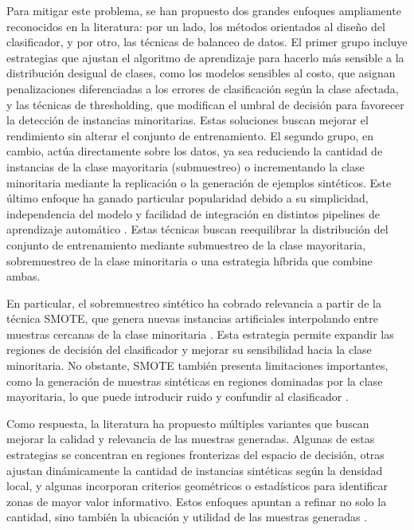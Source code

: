 \documentclass[12pt,a4paper]{article}
\begin{document}
Para mitigar este problema, se han propuesto dos grandes enfoques ampliamente reconocidos en la literatura: por un lado, los métodos orientados al diseño del clasificador, y por otro, las técnicas de balanceo de datos. El primer grupo incluye estrategias que ajustan el algoritmo de aprendizaje para hacerlo más sensible a la distribución desigual de clases, como los modelos sensibles al costo, que asignan penalizaciones diferenciadas a los errores de clasificación según la clase afectada, y las técnicas de thresholding, que modifican el umbral de decisión para favorecer la detección de instancias minoritarias. Estas soluciones buscan mejorar el rendimiento sin alterar el conjunto de entrenamiento. El segundo grupo, en cambio, actúa directamente sobre los datos, ya sea reduciendo la cantidad de instancias de la clase mayoritaria (submuestreo) o incrementando la clase minoritaria mediante la replicación o la generación de ejemplos sintéticos. Este último enfoque ha ganado particular popularidad debido a su simplicidad, independencia del modelo y facilidad de integración en distintos pipelines de aprendizaje automático \parencite{khorshidi2025synthetic}. Estas técnicas buscan reequilibrar la distribución del conjunto de entrenamiento mediante submuestreo de la clase mayoritaria, sobremuestreo de la clase minoritaria o una estrategia híbrida que combine ambas.

En particular, el sobremuestreo sintético ha cobrado relevancia a partir de la técnica SMOTE, que genera nuevas instancias artificiales interpolando entre muestras cercanas de la clase minoritaria \parencite{chawla2002smote}. Esta estrategia permite expandir las regiones de decisión del clasificador y mejorar su sensibilidad hacia la clase minoritaria. No obstante, SMOTE también presenta limitaciones importantes, como la generación de muestras sintéticas en regiones dominadas por la clase mayoritaria, lo que puede introducir ruido y confundir al clasificador \parencite{wang2024bmkc}.

Como respuesta, la literatura ha propuesto múltiples variantes que buscan mejorar la calidad y relevancia de las muestras generadas. Algunas de estas estrategias se concentran en regiones fronterizas del espacio de decisión, otras ajustan dinámicamente la cantidad de instancias sintéticas según la densidad local, y algunas incorporan criterios geométricos o estadísticos para identificar zonas de mayor valor informativo. Estos enfoques apuntan a refinar no solo la cantidad, sino también la ubicación y utilidad de las muestras generadas \parencite{han2005borderline, he2008adasyn, qiu2025vs}.
\end{document}
